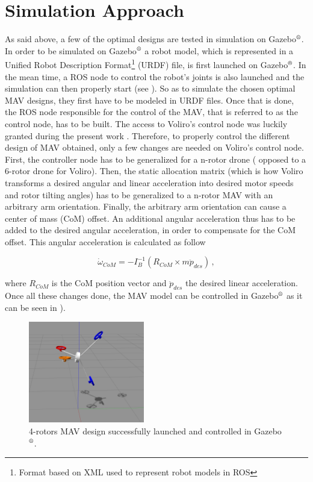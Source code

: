 \section{Simulation Approach}
\label{sec:control_approach}
As said above, a few of the optimal designs are tested in simulation on
Gazebo$^\textrm{\textregistered}$. In order to be simulated on
Gazebo$^\textrm{\textregistered}$ a robot model, which is represented
in a Unified Robot Description Format\footnote{Format based on XML used
to represent robot models in ROS} (URDF) file, is first launched on
Gazebo$^\textrm{\textregistered}$. In the mean time, a ROS node to control
the robot’s joints is also launched and the simulation can then properly start
(see ).
So as to simulate the chosen optimal MAV designs, they first have to be
modeled in URDF files. Once that is done, the ROS node responsible for the
control of the MAV, that is referred to as the control node, has to be built.
The access to Voliro’s control node was luckily granted during the present work
 \citep{kamel_voliro:_2018}. Therefore, to properly control the different
design of MAV obtained, only a few changes are needed on Voliro’s control
node. First, the controller node has to be generalized for a n-rotor drone (
opposed to a 6-rotor drone for Voliro). Then, the static allocation matrix
(which is how Voliro transforms a desired angular and linear acceleration into
desired motor speeds and rotor tilting angles)
has to be generalized to a n-rotor MAV with an arbitrary arm orientation.
Finally, the arbitrary arm orientation can cause a center of mass (CoM)
offset. An additional angular acceleration thus has to be added to the desired
angular acceleration, in order to compensate for the CoM offset. This
angular acceleration is calculated as follow

\begin{equation}
  \label{com_offset}
	\dot{\omega}_{CoM} = -I_B^{-1}(R_{CoM}\times m\ddot{p}_{des})\, ,
\end{equation}

where $R_{CoM}$ is the CoM position vector and $\ddot{p}_{des}$ the desired
linear acceleration.\\
Once all these changes done, the MAV model can be controlled in
Gazebo$^\textrm{\textregistered}$ as it can be seen in ).

\begin{figure}[!h]
  \centering
  \includegraphics[width=0.45\textwidth]{images/sim_gazebo.png}
  \caption{4-rotors MAV design successfully launched and controlled in Gazebo$^\textrm{\textregistered}$.}
  \label{fig:sim_gazebo}
\end{figure}

